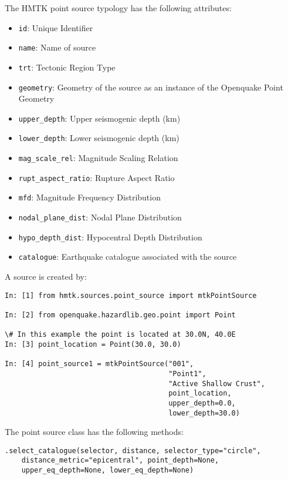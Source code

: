 The HMTK point source typology has the following attributes:

\begin{itemize}

\item \verb=id=: Unique Identifier
\item \verb=name=: Name of source
\item \verb=trt=: Tectonic Region Type
\item \verb=geometry=: Geometry of the source as an instance of the Openquake Point Geometry 
\item \verb=upper_depth=: Upper seismogenic depth (km)
\item \verb=lower_depth=: Lower seismogenic depth (km)
\item \verb=mag_scale_rel=: Magnitude Scaling Relation
\item \verb=rupt_aspect_ratio=: Rupture Aspect Ratio
\item \verb=mfd=: Magnitude Frequency Distribution
\item \verb=nodal_plane_dist=: Nodal Plane Distribution
\item \verb=hypo_depth_dist=: Hypocentral Depth Distribution
\item \verb=catalogue=: Earthquake catalogue associated with the source
\end{itemize}

A source is created by:

\begin{Verbatim}[frame=single, commandchars=\\\{\}, fontsize=\scriptsize, samepage=true]
In: [1] from hmtk.sources.point_source import mtkPointSource

In: [2] from openquake.hazardlib.geo.point import Point

\# In this example the point is located at 30.0N, 40.0E
In: [3] point_location = Point(30.0, 30.0)

In: [4] point_source1 = mtkPointSource("001",
                                       "Point1",
                                       "Active Shallow Crust",
                                       point_location,
                                       upper_depth=0.0,
                                       lower_depth=30.0)
\end{Verbatim}

The point source class has the following methods:

\verb;.select_catalogue(selector, distance, selector_type="circle",;\\
\verb;    distance_metric="epicentral", point_depth=None,;\\
\verb;    upper_eq_depth=None, lower_eq_depth=None);

